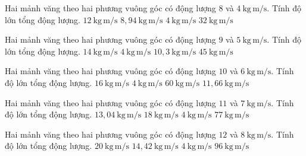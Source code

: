 \begin{ex}
Hai mảnh văng theo hai phương vuông góc có động lượng $8$ và $4\ \mathrm{kg\,m/s}$. Tính độ lớn tổng động lượng.
\choice
{$12\ \mathrm{kg\,m/s}$}
{\True $8,94\ \mathrm{kg\,m/s}$}
{$4\ \mathrm{kg\,m/s}$}
{$32\ \mathrm{kg\,m/s}$}
\end{ex}

\begin{ex}
Hai mảnh văng theo hai phương vuông góc có động lượng $9$ và $5\ \mathrm{kg\,m/s}$. Tính độ lớn tổng động lượng.
\choice
{$14\ \mathrm{kg\,m/s}$}
{$4\ \mathrm{kg\,m/s}$}
{\True $10,3\ \mathrm{kg\,m/s}$}
{$45\ \mathrm{kg\,m/s}$}
\end{ex}

\begin{ex}
Hai mảnh văng theo hai phương vuông góc có động lượng $10$ và $6\ \mathrm{kg\,m/s}$. Tính độ lớn tổng động lượng.
\choice
{$16\ \mathrm{kg\,m/s}$}
{$4\ \mathrm{kg\,m/s}$}
{$60\ \mathrm{kg\,m/s}$}
{\True $11,66\ \mathrm{kg\,m/s}$}
\end{ex}

\begin{ex}
Hai mảnh văng theo hai phương vuông góc có động lượng $11$ và $7\ \mathrm{kg\,m/s}$. Tính độ lớn tổng động lượng.
\choice
{\True $13,04\ \mathrm{kg\,m/s}$}
{$18\ \mathrm{kg\,m/s}$}
{$4\ \mathrm{kg\,m/s}$}
{$77\ \mathrm{kg\,m/s}$}
\end{ex}

\begin{ex}
Hai mảnh văng theo hai phương vuông góc có động lượng $12$ và $8\ \mathrm{kg\,m/s}$. Tính độ lớn tổng động lượng.
\choice
{$20\ \mathrm{kg\,m/s}$}
{\True $14,42\ \mathrm{kg\,m/s}$}
{$4\ \mathrm{kg\,m/s}$}
{$96\ \mathrm{kg\,m/s}$}
\end{ex}

